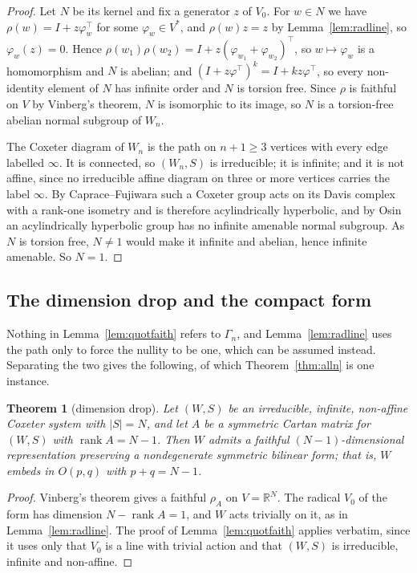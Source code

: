 \documentclass[11pt]{article}
\newtheorem{theorem}{Theorem}[section]
\theoremstyle{definition}
\theoremstyle{remark}
\theoremstyle{definition}
\begin{document}
\begin{proof}
Let $N$ be its kernel and fix a generator $z$ of $V_0$. For $w\in N$ we have
$\rho(w)=I+z\varphi_w^{\!\top}$ for some $\varphi_w\in V^{*}$, and $\rho(w)z=z$ by
Lemma~\ref{lem:radline}, so $\varphi_w(z)=0$. Hence
$\rho(w_1)\rho(w_2)=I+z(\varphi_{w_1}+\varphi_{w_2})^{\!\top}$, so $w\mapsto\varphi_w$ is a
homomorphism and $N$ is abelian; and $(I+z\varphi^{\!\top})^k=I+kz\varphi^{\!\top}$, so every
non-identity element of $N$ has infinite order and $N$ is torsion free. Since $\rho$ is faithful on
$V$ by Vinberg's theorem, $N$ is isomorphic to its image, so $N$ is a torsion-free abelian normal
subgroup of $W_n$.

The Coxeter diagram of $W_n$ is the path on $n+1\ge3$ vertices with every edge labelled $\infty$.
It is connected, so $(W_n,S)$ is irreducible; it is infinite; and it is not affine, since no
irreducible affine diagram on three or more vertices carries the label $\infty$. By
Caprace--Fujiwara \cite{CapraceFujiwara} such a Coxeter group acts on its Davis complex with a
rank-one isometry and is therefore acylindrically hyperbolic, and by Osin \cite{Osin} an
acylindrically hyperbolic group has no infinite amenable normal subgroup. As $N$ is torsion free,
$N\ne1$ would make it infinite and abelian, hence infinite amenable. So $N=1$.
\end{proof}

\subsection{The dimension drop and the compact form}\label{sec:general}

Nothing in Lemma~\ref{lem:quotfaith} refers to $\Gamma_n$, and Lemma~\ref{lem:radline} uses the
path only to force the nullity to be one, which can be assumed instead. Separating the two gives
the following, of which Theorem~\ref{thm:alln} is one instance.

\begin{theorem}[dimension drop]\label{thm:dimdrop}
Let $(W,S)$ be an irreducible, infinite, non-affine Coxeter system with $|S|=N$, and let $A$ be a
symmetric Cartan matrix for $(W,S)$ with $\operatorname{rank}A=N-1$. Then $W$ admits a faithful
$(N-1)$-dimensional representation preserving a nondegenerate symmetric bilinear form; that is,
$W$ embeds in $O(p,q)$ with $p+q=N-1$.
\end{theorem}

\begin{proof}
Vinberg's theorem gives a faithful $\rho_A$ on $V=\mathbb{R}^N$. The radical $V_0$ of the form has
dimension $N-\operatorname{rank}A=1$, and $W$ acts trivially on it, as in
Lemma~\ref{lem:radline}. The proof of Lemma~\ref{lem:quotfaith} applies verbatim, since it uses
only that $V_0$ is a line with trivial action and that $(W,S)$ is irreducible, infinite and
non-affine.
\end{proof}
\end{document}
